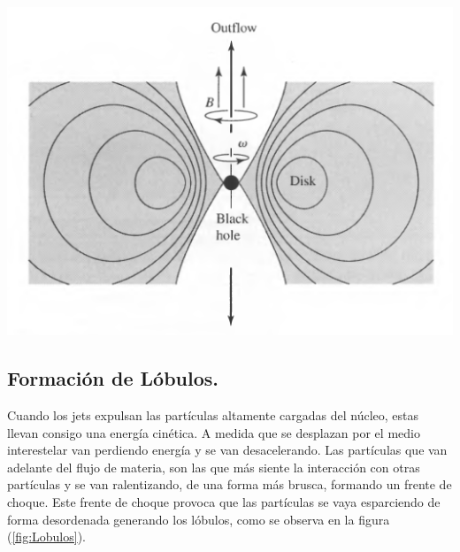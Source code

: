 \includegraphics[scale=.5]{./figures/3_AGNs/Jets.png}
\label{fig:Modelo_interior_AGN}


	\subsection{Formación de Lóbulos.}
	\label{subsec:Formation_lobules}

Cuando los jets expulsan las partículas altamente cargadas del núcleo, estas llevan consigo una energía cinética. A medida que se desplazan por el medio interestelar van perdiendo energía y se van desacelerando. Las partículas que van adelante del flujo de materia, son las que más siente la interacción con otras partículas y se van ralentizando, de una forma más brusca, formando un frente de choque. Este frente de choque provoca que las partículas se vaya esparciendo  de forma desordenada generando los lóbulos, como se observa en la figura (\ref{fig:Lobulos}).

